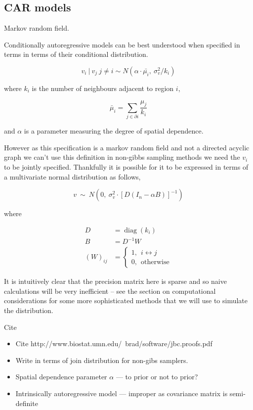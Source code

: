 \documentclass{article}
\begin{document}
\subsection{CAR models}

Markov random field.

Conditionally autoregressive models can be best understood when specified in terms in terms of their conditional distribution. 

\begin{equation}
v_i \ | \ v_j \ j \neq i \sim N(\alpha \cdot \bar{\mu_i}, \ \sigma_v^2/k_i)
\end{equation}

where $k_i$ is the number of neighbours adjacent to region $i$,

\begin{equation}
\bar{\mu}_i = \sum_{j \in \partial i} \frac{\mu_j}{k_i}
\end{equation}

and $\alpha$ is a parameter measuring the degree of spatial dependence. 

However as this specification is a markov random field and not a directed acyclic graph we can't use this definition in non-gibbs sampling methods \- we need the $v_i$ to be jointly specified. Thankfully it is possible for it to be expressed in terms of a multivariate normal distribution as follows,

\begin{equation}
v \ \sim \ N(0, \ \sigma_v^2 \cdot {[D(I_n - \alpha B)]}^{-1})
\end{equation}

where

\begin{align}
D &= \operatorname{diag}(k_i) \\
B &= D^{-1} W \\
{(W)}_{ij} &= 
\begin{cases}
1, \ \ i \leftrightarrow j \\
0, \ \ \textrm{otherwise}
\end{cases}
\end{align} 

It is intuitively clear that the precision matrix here is sparse and so naive calculations will be very inefficient -- see the section on computational considerations for some more sophisticated methods that we will use to simulate the distribution.

Cite \cite{car}

\begin{itemize}

\item Cite http://www.biostat.umn.edu/~brad/software/jbc.proofs.pdf

\item Write in terms of join distribution for non-gibs samplers.

\item Spatial dependence parameter $\alpha$ --- to prior or not to prior?

\item Intrinsically autoregressive model --- improper as covariance matrix is semi-definite

\end{itemize}
\end{document}
